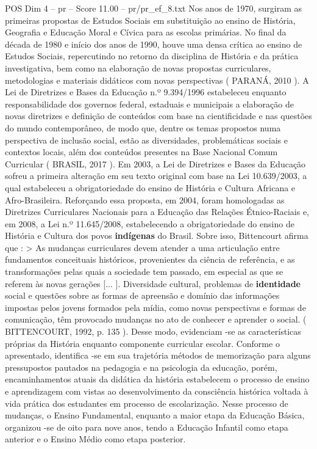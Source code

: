 \begin{textsample}{POS Dim 4 – pr – Score 11.00 – pr/pr\_ef\_8.txt}
Nos anos de 1970, surgiram as primeiras propostas de Estudos Sociais em substituição ao ensino de História, Geografia e Educação Moral e Cívica para as escolas primárias.
No final da década de 1980 e início dos anos de 1990, houve uma densa crítica ao ensino de Estudos Sociais, repercutindo no retorno da disciplina de História e da prática investigativa, bem como na elaboração de novas propostas curriculares, metodologias e materiais didáticos com novas perspectivas ( PARANÁ, 2010 ).
A Lei de Diretrizes e Bases da Educação n.º 9.394/1996 estabeleceu enquanto responsabilidade dos governos federal, estaduais e municipais a elaboração de novas diretrizes e definição de conteúdos com base na cientificidade e nas questões do mundo contemporâneo, de modo que, dentre os temas propostos numa perspectiva de inclusão social, estão as diversidades, problemáticas sociais e contextos locais, além dos conteúdos presentes na Base Nacional Comum Curricular ( BRASIL, 2017 ).
Em 2003, a Lei de Diretrizes e Bases da Educação sofreu a primeira alteração em seu texto original com base na Lei 10.639/2003, a qual estabeleceu a obrigatoriedade do ensino de História e Cultura Africana e Afro-Brasileira.
Reforçando essa proposta, em 2004, foram homologadas as Diretrizes Curriculares Nacionais para a Educação das Relações Étnico-Raciais e, em 2008, a Lei n.º 11.645/2008, estabelecendo a obrigatoriedade do ensino de História e Cultura dos povos \textbf{indígenas} do Brasil.
Sobre isso, Bittencourt afirma que : > As mudanças curriculares devem atender a uma articulação entre fundamentos conceituais históricos, provenientes da ciência de referência, e as transformações pelas quais a sociedade tem passado, em especial as que se referem às novas gerações [... ].
Diversidade cultural, problemas de \textbf{identidade} social e questões sobre as formas de apreensão e domínio das informações impostas pelos jovens formados pela mídia, como novas perspectivas e formas de comunicação, têm provocado mudanças no ato de conhecer e aprender o social. ( BITTENCOURT, 1992, p. 135 ).
Desse modo, evidenciam -se as características próprias da História enquanto componente curricular escolar.
Conforme o apresentado, identifica -se em sua trajetória métodos de memorização para alguns pressupostos pautados na pedagogia e na psicologia da educação, porém, encaminhamentos atuais da didática da história estabelecem o processo de ensino e aprendizagem com vistas ao desenvolvimento da consciência histórica voltada à vida prática dos estudantes em processo de escolarização.
Nesse processo de mudanças, o Ensino Fundamental, enquanto a maior etapa da Educação Básica, organizou -se de oito para nove anos, tendo a Educação Infantil como etapa anterior e o Ensino Médio como etapa posterior.

\end{textsample}
